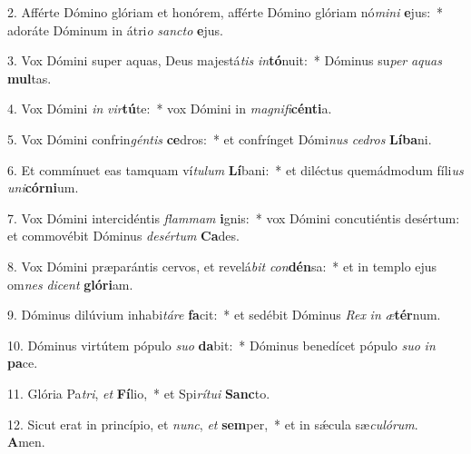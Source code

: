2. Afférte Dómino glóriam et honórem, afférte Dómino glóriam nó\textit{mi}\textit{ni} \textbf{e}jus:~*  adoráte Dóminum in átri\textit{o} \textit{sanc}\textit{to} \textbf{e}jus.\

3. Vox Dómini super aquas, Deus majestá\textit{tis} \textit{in}\textbf{tó}nuit:~*  Dóminus su\textit{per} \textit{a}\textit{quas} \textbf{mul}tas.\

4. Vox Dómini \textit{in} \textit{vir}\textbf{tú}te:~*  vox Dómini in \textit{ma}\textit{gni}\textit{fi}\textbf{cén}\textbf{ti}a.\

5. Vox Dómini confrin\textit{gén}\textit{tis} \textbf{ce}dros:~*  et confrínget Dómi\textit{nus} \textit{ce}\textit{dros} \textbf{Lí}\textbf{ba}ni.\

6. Et commínuet eas tamquam ví\textit{tu}\textit{lum} \textbf{Lí}bani:~*  et diléctus quemádmodum fíli\textit{us} \textit{u}\textit{ni}\textbf{cór}\textbf{ni}um.\

7. Vox Dómini intercidéntis \textit{flam}\textit{mam} \textbf{i}gnis:~*  vox Dómini concutiéntis desértum: et commovébit Dóminus \textit{de}\textit{sér}\textit{tum} \textbf{Ca}des.\

8. Vox Dómini præparántis cervos, et revelá\textit{bit} \textit{con}\textbf{dén}sa:~*  et in templo ejus om\textit{nes} \textit{di}\textit{cent} \textbf{gló}\textbf{ri}am.\

9. Dóminus dilúvium inhabi\textit{tá}\textit{re} \textbf{fa}cit:~*  et sedébit Dóminus \textit{Rex} \textit{in} \textit{æ}\textbf{tér}num.\

10. Dóminus virtútem pópulo \textit{su}\textit{o} \textbf{da}bit:~*  Dóminus benedícet pópulo \textit{su}\textit{o} \textit{in} \textbf{pa}ce.\

11. Glória Pa\textit{tri}, \textit{et} \textbf{Fí}lio,~*  et Spi\textit{rí}\textit{tu}\textit{i} \textbf{Sanc}to.\

12. Sicut erat in princípio, et \textit{nunc}, \textit{et} \textbf{sem}per,~*  et in sǽcula sæ\textit{cu}\textit{ló}\textit{rum}. \textbf{A}men.\

